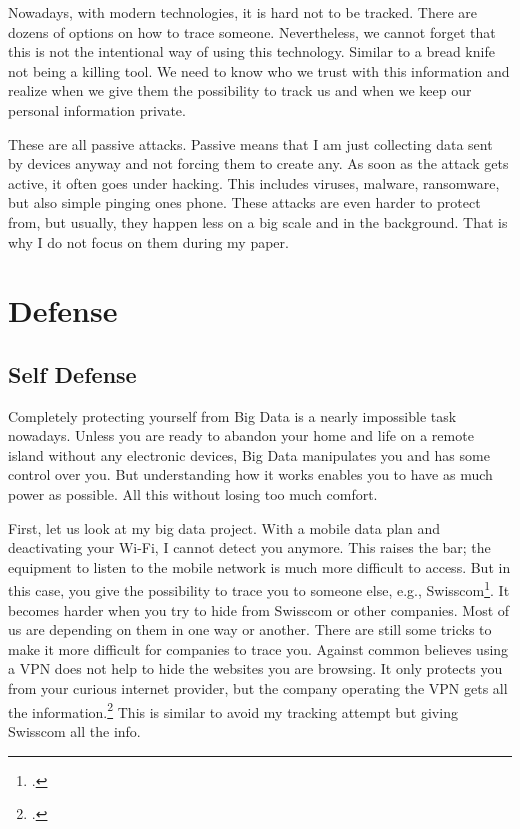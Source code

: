 \documentclass[paper=a4, fontsize=11pt]{article}
\begin{document}
Nowadays, with modern technologies, it is hard not to be tracked. There are dozens of options on how to trace someone. Nevertheless, we cannot forget that this is not the intentional way of using this technology. Similar to a bread knife not being a killing tool. We need to know who we trust with this information and realize when we give them the possibility to track us and when we keep our personal information private.

These are all passive attacks. Passive means that I am just collecting data sent by devices anyway and not forcing them to create any. As soon as the attack gets active, it often goes under hacking. This includes viruses, malware, ransomware, but also simple pinging ones phone. These attacks are even harder to protect from, but usually, they happen less on a big scale and in the background. That is why I do not focus on them during my paper.



\section{Defense}
\subsection{Self Defense}
\label{selfdefense}

Completely protecting yourself from Big Data is a nearly impossible task nowadays. Unless you are ready to abandon your home and life on a remote island without any electronic devices, Big Data manipulates you and has some control over you. But understanding how it works enables you to have as much power as possible. All this without losing too much comfort.

First, let us look at my big data project. With a mobile data plan and deactivating your Wi-Fi, I cannot detect you anymore. This raises the bar; the equipment to listen to the mobile network is much more difficult to access. But in this case, you give the possibility to trace you to someone else, e.g., Swisscom\footcite{swisscomads}.
It becomes harder when you try to hide from Swisscom or other companies. Most of us are depending on them in one way or another. There are still some tricks to make it more difficult for companies to trace you. Against common believes using a VPN does not help to hide the websites you are browsing. It only protects you from your curious internet provider, but the company operating the VPN gets all the information.\footcite{tomscottvpn} This is similar to avoid my tracking attempt but giving Swisscom all the info.
\end{document}
